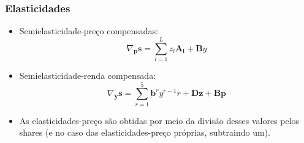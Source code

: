 \documentclass{beamer}
\begin{document}
\begin{frame}[fragile]\frametitle{Elasticidades}
\begin{itemize}
  \item Semielasticidade-preço compensadas:
  \[
  \nabla_{\mathbf{p}}\mathbf{s}=\sum_{l=1}^{L}z_{l}\mathbf{A_{l}} + \mathbf{B}y
  \]
  \item Semielasticidade-renda compensada:
  \[
  \nabla_{\mathbf{y}}\mathbf{s}=\sum_{r=1}^{5} \mathbf{b}^{r} y^{r-1} r + \mathbf{Dz} + \mathbf{Bp}
  \]
  \item As elasticidades-preço são obtidas por meio da divisão desses valores pelos shares (e no caso das elasticidades-preço próprias, subtraindo um).
\end{itemize}
    


\end{frame}


\begin{frame}[allowframebreaks]



\end{frame}

\end{document}
